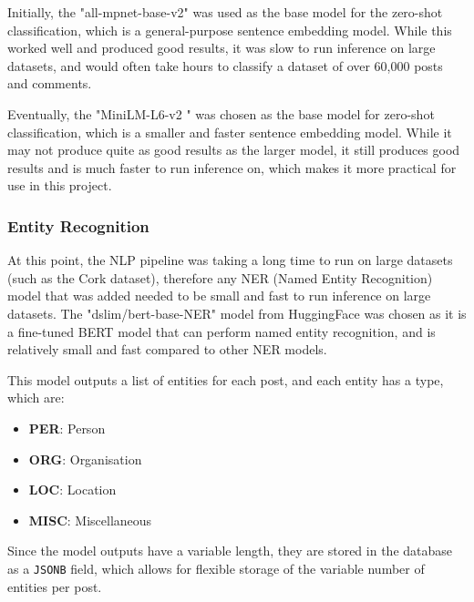 \documentclass[12pt, a4paper]{article}
\begin{document}
Initially, the "all-mpnet-base-v2" \cite{all_mpnet_base_v2} was used as the base model for the zero-shot classification, which is a general-purpose sentence embedding model. While this worked well and produced good results, it was slow to run inference on large datasets, and would often take hours to classify a dataset of over 60,000 posts and comments.

Eventually, the "MiniLM-L6-v2 " \cite{minilm_l6_v2} was chosen as the base model for zero-shot classification, which is a smaller and faster sentence embedding model. While it may not produce quite as good results as the larger model, it still produces good results and is much faster to run inference on, which makes it more practical for use in this project.

\subsubsection{Entity Recognition}
At this point, the NLP pipeline was taking a long time to run on large datasets (such as the Cork dataset), therefore any NER (Named Entity Recognition) model that was added needed to be small and fast to run inference on large datasets. The "dslim/bert-base-NER" model from HuggingFace \cite{dslim_bert_base_ner} was chosen as it is a fine-tuned BERT model that can perform named entity recognition, and is relatively small and fast compared to other NER models.

This model outputs a list of entities for each post, and each entity has a type, which are:
\begin{itemize}
    \item \textbf{PER}: Person
    \item \textbf{ORG}: Organisation
    \item \textbf{LOC}: Location
    \item \textbf{MISC}: Miscellaneous
\end{itemize}

Since the model outputs have a variable length, they are stored in the database as a \texttt{JSONB} field, which allows for flexible storage of the variable number of entities per post.
\end{document}
